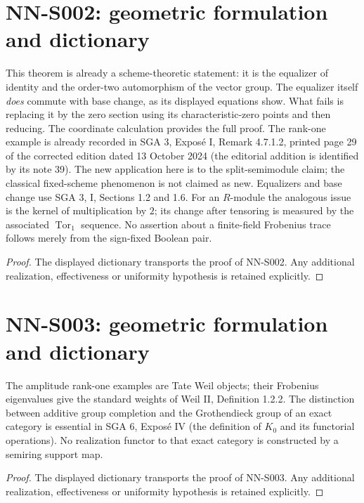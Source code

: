 \section{NN-S002: geometric formulation and dictionary}
\begin{geometricstatement}[NN-S002]
This theorem is already a scheme-theoretic statement: it is the
equalizer of identity and the order-two automorphism of the vector
group. The equalizer itself \emph{does} commute with base change,
as its displayed equations show. What fails is replacing it by the
zero section using its characteristic-zero points and then reducing.
The coordinate calculation provides the full proof. The rank-one
example is already recorded in SGA 3, Expos\'e I, Remark 4.7.1.2,
printed page 29 of the corrected edition dated 13 October 2024
(the editorial addition is identified by its note 39). The new
application here is to the split-semimodule claim; the classical
fixed-scheme phenomenon is not claimed as new. Equalizers and base
change use SGA 3, I, Sections 1.2 and 1.6.
For an $R$-module the analogous issue is the kernel of multiplication
by $2$; its change after tensoring is measured by the associated
$\operatorname{Tor}_1$ sequence. No assertion about a finite-field
Frobenius trace follows merely from the sign-fixed Boolean pair.
\end{geometricstatement}
\begin{proof} The displayed dictionary transports the proof of NN-S002. Any additional realization, effectiveness or uniformity hypothesis is retained explicitly.\end{proof}


\section{NN-S003: geometric formulation and dictionary}
\begin{geometricstatement}[NN-S003]
The amplitude rank-one examples are Tate Weil objects; their
Frobenius eigenvalues give the standard weights of Weil II,
Definition 1.2.2. The distinction between additive group completion
and the Grothendieck group of an exact category is essential in
SGA 6, Expos\'e IV (the definition of $K_0$ and its functorial
operations). No realization functor to that exact category is
constructed by a semiring support map.
\end{geometricstatement}
\begin{proof} The displayed dictionary transports the proof of NN-S003. Any additional realization, effectiveness or uniformity hypothesis is retained explicitly.\end{proof}


